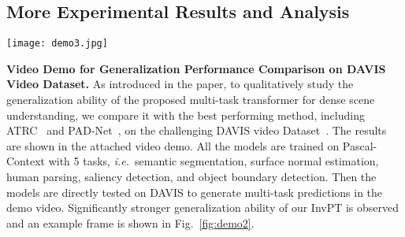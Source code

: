 \documentclass[runningheads]{llncs}
\newcommand*{\ie}{\emph{i.e.}}
\begin{document}
\renewcommand{\arraystretch}{1.3}
\begin{table}[ht]
\setlength{\tabcolsep}{4pt}
\vspace{-20pt}
\centering
\caption{Shapes of $\mathbf{Q}, \mathbf{K}, \mathbf{V}$ matrices in different upsampling stages. Please refer to Sec. 3.4 in paper for the detailed definitions of the notations in the table.}
\label{tab:qkv}
\vspace{-2pt}
\end{table}
\renewcommand{\arraystretch}{1}



\subsection{More Experimental Results and Analysis}

\begin{figure*}[t]
	\centering
	\texttt{[image: demo3.jpg]}
	\vspace{-15pt}
	\caption{An example frame of the demo video for the study of generalization performance. Models are all trained on PASCAL-Context and tested on DAVIS video dataset. Our method yields qualitatively better generalization performance compared to PAD-Net~\cite{padnet} and ATRC~\cite{atrc}.
	}
	\label{fig:demo2}
	\vspace{-15pt}
\end{figure*}

\par\noindent\textbf{Video Demo for Generalization Performance Comparison on DAVIS Video Dataset.}
As introduced in the paper, to qualitatively study the generalization ability of the proposed multi-task transformer for dense scene understanding, we compare it with the best performing method, including ATRC~\cite{atrc} and PAD-Net~\cite{padnet}, on the challenging DAVIS video Dataset~\cite{davis}.
The results are shown in the attached video demo.
All the models are trained on Pascal-Context with 5 tasks, \ie~semantic segmentation, surface normal estimation, human parsing, saliency detection, and object boundary detection.
Then the models are directly tested on DAVIS to generate multi-task predictions in the demo video.
Significantly stronger generalization ability of our InvPT is observed and
an example frame is shown in Fig.~\ref{fig:demo2}.
\end{document}
